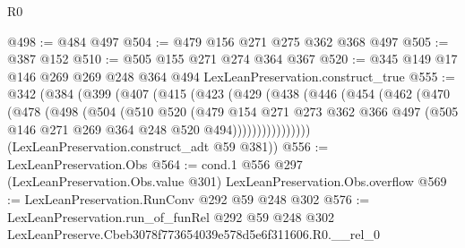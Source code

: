 \begin{lexlean}{R0}
\begin{coremodule}
@498 := @484 @497
@504 := @479 @156 @271 @275 @362 @368 @497
@505 := @387 @152
@510 := @505 @155 @271 @274 @364 @367
@520 := @345 @149 @17 @146 @269 @269 @248 @364 @494 LexLeanPreservation.construct_true
@555 := @342
    (@384
      (@399
        (@407
          (@415
            (@423
              (@429
                (@438
                  (@446
                    (@454
                      (@462
                        (@470
                          (@478
                            (@498
                              (@504
                                (@510
                                  @520
                                  (@479
                                    @154
                                    @271
                                    @273
                                    @362
                                    @366
                                    @497
                                    (@505 @146 @271 @269 @364 @248 @520 @494))))))))))))))))
      (LexLeanPreservation.construct_adt @59 @381))
@556 := LexLeanPreservation.Obs
@564 := cond.{1} @556 @297 (LexLeanPreservation.Obs.value @301) LexLeanPreservation.Obs.overflow
@569 := LexLeanPreservation.RunConv @292 @59 @248 @302
@576 := LexLeanPreservation.run_of_funRel
    @292
    @59
    @248
    @302
    LexLeanPreserve.Cbeb3078f773654039e578d5e6f311606.R0.__rel_0
\end{coremodule}
\end{lexlean}
